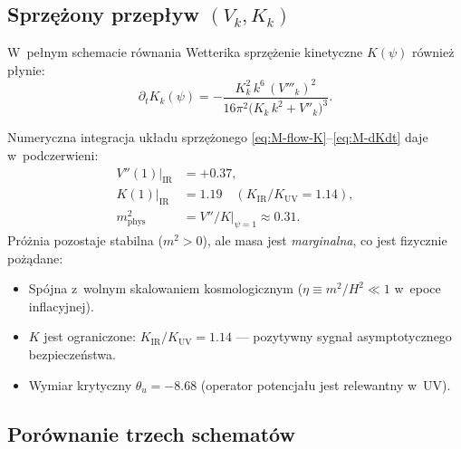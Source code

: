 \subsection{Sprz\k{e}\.zony przep\l{}yw $(V_k, K_k)$}
\label{ssec:M-coupled}

W~pe\l{}nym schemacie r\'ownania Wetterika
sprz\k{e}\.zenie kinetyczne $K(\psi)$ r\'ownie\.z p\l{}ynie:
\begin{equation}\label{eq:M-dKdt}
    \partial_t K_k(\psi)
    = -\frac{K_k^2\,k^6\,(V'''_k)^2}
            {16\pi^2\bigl(K_k\,k^2 + V''_k\bigr)^3}.
\end{equation}

\begin{proposition}%
\label{prop:M-marginal-mass}
Numeryczna integracja uk\l{}adu sprz\k{e}\.zonego
\eqref{eq:M-flow-K}--\eqref{eq:M-dKdt} daje w~podczerwieni:
\begin{align}
    V''(1)\big|_{\mathrm{IR}} &= +0.37, \\
    K(1)\big|_{\mathrm{IR}} &= 1.19
    \quad (K_{\mathrm{IR}}/K_{\mathrm{UV}} = 1.14), \\
    m^2_{\mathrm{phys}} &= V''/K\big|_{\psi=1}
    \approx \mathbf{0.31}.
\end{align}
Pr\'o\.znia pozostaje stabilna ($m^2 > 0$),
ale masa jest \emph{marginalna},
co jest fizycznie po\.z\k{a}dane:
\begin{itemize}[nosep]
\item Sp\'ojna z~wolnym skalowaniem kosmologicznym
      ($\eta \equiv m^2/H^2 \ll 1$ w~epoce inflacyjnej).
\item $K$ jest ograniczone: $K_{\mathrm{IR}}/K_{\mathrm{UV}} = 1.14$
      --- pozytywny sygna\l{} asymptotycznego bezpiecze\'nstwa.
\item Wymiar krytyczny $\theta_u = -8.68$
      (operator potencja\l{}u jest relewantny w~UV).
\end{itemize}
\end{proposition}

\subsection{Por\'ownanie trzech schemat\'ow}
\label{ssec:M-comparison}

